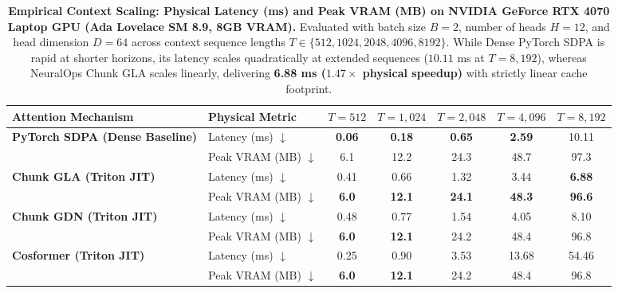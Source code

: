 \begin{table}[t]
\centering
\caption{\textbf{Empirical Context Scaling: Physical Latency (ms) and Peak VRAM (MB) on NVIDIA GeForce RTX 4070 Laptop GPU (Ada Lovelace SM 8.9, 8GB VRAM).}
Evaluated with batch size $B=2$, number of heads $H=12$, and head dimension $D=64$ across context sequence lengths $T \in \{512, 1024, 2048, 4096, 8192\}$.
While Dense PyTorch SDPA is rapid at shorter horizons, its latency scales quadratically at extended sequences ($10.11$ ms at $T=8,192$), whereas NeuralOps Chunk GLA scales linearly, delivering \textbf{6.88 ms ($1.47\times$ physical speedup)} with strictly linear cache footprint.}
\label{tab:long_context}
\scriptsize
\setlength{\tabcolsep}{4.5pt}
\begin{tabular}{llccccc}
\toprule
\textbf{Attention Mechanism} & \textbf{Physical Metric} & \textbf{$T = 512$} & \textbf{$T = 1,024$} & \textbf{$T = 2,048$} & \textbf{$T = 4,096$} & \textbf{$T = 8,192$} \\
\midrule
\multirow{2}{*}{\textbf{PyTorch SDPA (Dense Baseline)}} & Latency (ms) $\downarrow$ & \textbf{0.06} & \textbf{0.18} & \textbf{0.65} & \textbf{2.59} & 10.11 \\
 & Peak VRAM (MB) $\downarrow$ & 6.1 & 12.2 & 24.3 & 48.7 & 97.3 \\
\midrule
\multirow{2}{*}{\textbf{Chunk GLA (Triton JIT)}} & Latency (ms) $\downarrow$ & 0.41 & 0.66 & 1.32 & 3.44 & \textbf{6.88} \\
 & Peak VRAM (MB) $\downarrow$ & \textbf{6.0} & \textbf{12.1} & \textbf{24.1} & \textbf{48.3} & \textbf{96.6} \\
\midrule
\multirow{2}{*}{\textbf{Chunk GDN (Triton JIT)}} & Latency (ms) $\downarrow$ & 0.48 & 0.77 & 1.54 & 4.05 & 8.10 \\
 & Peak VRAM (MB) $\downarrow$ & \textbf{6.0} & \textbf{12.1} & 24.2 & 48.4 & 96.8 \\
\midrule
\multirow{2}{*}{\textbf{Cosformer (Triton JIT)}} & Latency (ms) $\downarrow$ & 0.25 & 0.90 & 3.53 & 13.68 & 54.46 \\
 & Peak VRAM (MB) $\downarrow$ & \textbf{6.0} & \textbf{12.1} & 24.2 & 48.4 & 96.8 \\
\bottomrule
\end{tabular}
\end{table}
